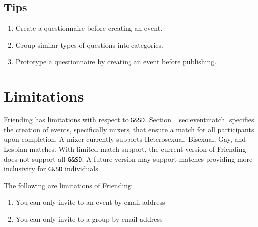 \documentclass[a4paper,11pt,titlepage]{scrartcl}
\newcommand{\textapp}[1]{{\fontfamily{cmss}\selectfont#1}}
\newcommand{\Friending}{\textapp{Friending}}
\newcommand{\abbrevation}[1]{\texttt{#1}}
\begin{document}
\subsection{Tips}
\label{sec:tips}
\begin{enumerate}
\item Create a questionnaire before creating an event.
\item Group similar types of questions into categories.
\item Prototype a questionnaire by creating an event before publishing.
\end{enumerate}

\clearpage
\section{Limitations}
\label{sec:limitations}

\Friending{} has limitations with respect to \abbrevation{G\&SD}.  Section ~\ref{sec:eventmatch} specifies the creation of events, specifically mixers, that ensure a match for all participants upon completion.  A mixer currently supports Heterosexual, Bisexual, Gay, and Lesbian matches.  With limited match support, the current version of \Friending{} does not support all \abbrevation{G\&SD}.  A future version may support matches providing more inclusivity for \abbrevation{G\&SD} individuals.

The following are limitations of \Friending{}:
\begin{enumerate}
\item You can only invite to an event by email address
\item You can only invite to a group by email address
\end{enumerate}
\end{document}
